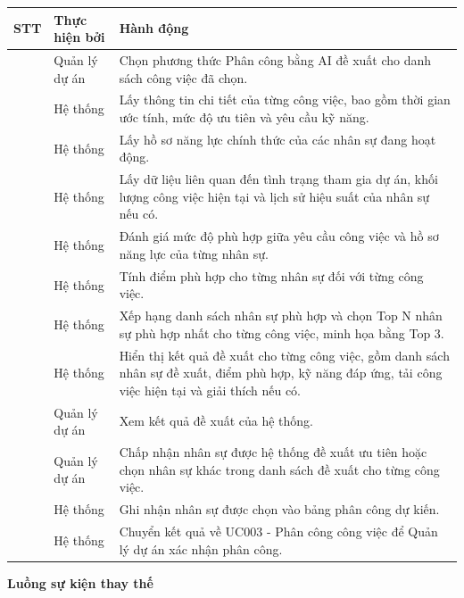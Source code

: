 \documentclass[../DoAn.tex]{subfiles}
\begin{document}
{\ucTableText
\begin{longtable}{|>{\centering\arraybackslash}p{}|p{}|p{}|}
\hline
\rowcolor{ucHeaderBg}\textbf{STT} & \textbf{Thực hiện bởi} & \textbf{Hành động} \\ \hline
1 & Quản lý dự án & Chọn phương thức Phân công bằng AI đề xuất cho danh sách công việc đã chọn. \\ \hline
2 & Hệ thống & Lấy thông tin chi tiết của từng công việc, bao gồm thời gian ước tính, mức độ ưu tiên và yêu cầu kỹ năng. \\ \hline
3 & Hệ thống & Lấy hồ sơ năng lực chính thức của các nhân sự đang hoạt động. \\ \hline
4 & Hệ thống & Lấy dữ liệu liên quan đến tình trạng tham gia dự án, khối lượng công việc hiện tại và lịch sử hiệu suất của nhân sự nếu có. \\ \hline
5 & Hệ thống & Đánh giá mức độ phù hợp giữa yêu cầu công việc và hồ sơ năng lực của từng nhân sự. \\ \hline
6 & Hệ thống & Tính điểm phù hợp cho từng nhân sự đối với từng công việc. \\ \hline
7 & Hệ thống & Xếp hạng danh sách nhân sự phù hợp và chọn Top N nhân sự phù hợp nhất cho từng công việc, minh họa bằng Top 3. \\ \hline
8 & Hệ thống & Hiển thị kết quả đề xuất cho từng công việc, gồm danh sách nhân sự đề xuất, điểm phù hợp, kỹ năng đáp ứng, tải công việc hiện tại và giải thích nếu có. \\ \hline
9 & Quản lý dự án & Xem kết quả đề xuất của hệ thống. \\ \hline
10 & Quản lý dự án & Chấp nhận nhân sự được hệ thống đề xuất ưu tiên hoặc chọn nhân sự khác trong danh sách đề xuất cho từng công việc. \\ \hline
11 & Hệ thống & Ghi nhận nhân sự được chọn vào bảng phân công dự kiến. \\ \hline
12 & Hệ thống & Chuyển kết quả về UC003 - Phân công công việc để Quản lý dự án xác nhận phân công. \\ \hline
\end{longtable}
}

\textbf{Luồng sự kiện thay thế}
\end{document}
